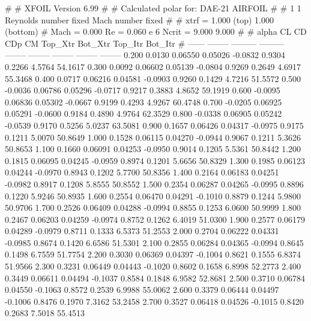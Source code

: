 #  
#       XFOIL         Version 6.99
#  
# Calculated polar for: DAE-21 AIRFOIL                                  
#  
# 1 1 Reynolds number fixed          Mach number fixed         
#  
# xtrf =   1.000 (top)        1.000 (bottom)  
# Mach =   0.000     Re =     0.060 e 6     Ncrit =   9.000  9.000
#  
#   alpha    CL        CD       CDp       CM     Top_Xtr  Bot_Xtr  Top_Itr  Bot_Itr
#  ------ -------- --------- --------- -------- -------- -------- -------- --------
   0.200   0.0130   0.06550   0.05026  -0.0832   0.9304   0.2266   4.5764  54.1617
   0.300   0.0092   0.06602   0.05139  -0.0804   0.9269   0.2649   4.6917  55.3468
   0.400   0.0717   0.06216   0.04581  -0.0903   0.9260   0.1429   4.7216  51.5572
   0.500  -0.0036   0.06786   0.05296  -0.0717   0.9217   0.3883   4.8652  59.1919
   0.600  -0.0095   0.06836   0.05302  -0.0667   0.9199   0.4293   4.9267  60.4748
   0.700  -0.0205   0.06925   0.05291  -0.0600   0.9184   0.4890   4.9764  62.3529
   0.800  -0.0338   0.06905   0.05242  -0.0539   0.9170   0.5256   5.0237  63.5081
   0.900   0.1657   0.06426   0.04317  -0.0975   0.9175   0.1211   5.0070  50.8649
   1.000   0.1528   0.06115   0.04270  -0.0944   0.9067   0.1211   5.3626  50.8653
   1.100   0.1660   0.06091   0.04253  -0.0950   0.9014   0.1205   5.5361  50.8442
   1.200   0.1815   0.06095   0.04245  -0.0959   0.8974   0.1201   5.6656  50.8329
   1.300   0.1985   0.06123   0.04244  -0.0970   0.8943   0.1202   5.7700  50.8356
   1.400   0.2164   0.06183   0.04251  -0.0982   0.8917   0.1208   5.8555  50.8552
   1.500   0.2354   0.06287   0.04265  -0.0995   0.8896   0.1220   5.9246  50.8935
   1.600   0.2554   0.06470   0.04291  -0.1010   0.8879   0.1244   5.9800  50.9706
   1.700   0.2526   0.06409   0.04288  -0.0994   0.8855   0.1253   6.0600  50.9999
   1.800   0.2467   0.06203   0.04259  -0.0974   0.8752   0.1262   6.4019  51.0300
   1.900   0.2577   0.06179   0.04289  -0.0979   0.8711   0.1333   6.5373  51.2553
   2.000   0.2704   0.06222   0.04331  -0.0985   0.8674   0.1420   6.6586  51.5301
   2.100   0.2855   0.06284   0.04365  -0.0994   0.8645   0.1498   6.7559  51.7754
   2.200   0.3030   0.06369   0.04397  -0.1004   0.8621   0.1555   6.8374  51.9566
   2.300   0.3231   0.06449   0.04443  -0.1020   0.8602   0.1658   6.8998  52.2773
   2.400   0.3449   0.06611   0.04494  -0.1037   0.8584   0.1848   6.9582  52.8681
   2.500   0.3710   0.06784   0.04550  -0.1063   0.8572   0.2539   6.9988  55.0062
   2.600   0.3379   0.06444   0.04497  -0.1006   0.8476   0.1970   7.3162  53.2458
   2.700   0.3527   0.06418   0.04526  -0.1015   0.8420   0.2683   7.5018  55.4513
